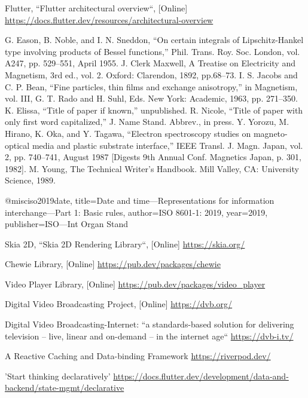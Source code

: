 \documentclass[conference]{IEEEtran}
\begin{document}
\begin{thebibliography}{00}
 Flutter, ``Flutter architectural overview``, [Online] \url{https://docs.flutter.dev/resources/architectural-overview}
	
 G. Eason, B. Noble, and I. N. Sneddon, ``On certain integrals of Lipschitz-Hankel type involving products of Bessel functions,'' Phil. Trans. Roy. Soc. London, vol. A247, pp. 529--551, April 1955.
 J. Clerk Maxwell, A Treatise on Electricity and Magnetism, 3rd ed., vol. 2. Oxford: Clarendon, 1892, pp.68--73.
 I. S. Jacobs and C. P. Bean, ``Fine particles, thin films and exchange anisotropy,'' in Magnetism, vol. III, G. T. Rado and H. Suhl, Eds. New York: Academic, 1963, pp. 271--350.
 K. Elissa, ``Title of paper if known,'' unpublished.
 R. Nicole, ``Title of paper with only first word capitalized,'' J. Name Stand. Abbrev., in press.
 Y. Yorozu, M. Hirano, K. Oka, and Y. Tagawa, ``Electron spectroscopy studies on magneto-optical media and plastic substrate interface,'' IEEE Transl. J. Magn. Japan, vol. 2, pp. 740--741, August 1987 [Digests 9th Annual Conf. Magnetics Japan, p. 301, 1982].
 M. Young, The Technical Writer's Handbook. Mill Valley, CA: University Science, 1989.

@misc{iso2019date,
  title={Date and time—Representations for information interchange—Part 1: Basic rules},
  author={ISO 8601-1: 2019},
  year={2019},
  publisher={ISO—Int Organ Stand}
}



 Skia 2D, ``Skia 2D Rendering Library``, [Online]
\url{https://skia.org/}

 Chewie Library, [Online] 
\url{https://pub.dev/packages/chewie}

 Video Player Library, [Online] 
\url{https://pub.dev/packages/video_player}


 Digital Video Broadcasting Project, [Online]
\url{https://dvb.org/}

 Digital Video Broadcasting-Internet: ``a standards-based solution for delivering television – live, linear and on-demand – in the internet age``
\url{https://dvb-i.tv/}

 A Reactive Caching and Data-binding Framework 
\url{https://riverpod.dev/}

 'Start thinking declaratively'
\url{https://docs.flutter.dev/development/data-and-backend/state-mgmt/declarative}




\end{thebibliography}
\end{document}
